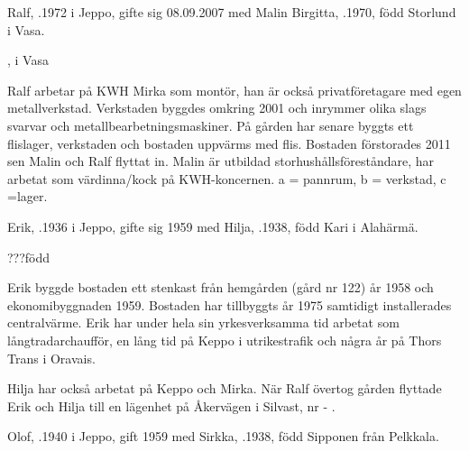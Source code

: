 


Ralf, .1972 i Jeppo, gifte sig 08.09.2007 med Malin Birgitta, .1970, född Storlund i Vasa.
\begin{jhchildren}
  \item {}, i Vasa
  \item {}
  \item {}
\end{jhchildren}

Ralf arbetar på KWH Mirka som montör, han är också privatföretagare med egen metallverkstad. Verkstaden byggdes omkring 2001 och inrymmer olika slags svarvar och metallbearbetningsmaskiner. På gården har senare byggts ett flislager, verkstaden och bostaden uppvärms med flis. Bostaden förstorades 2011 sen Malin och Ralf flyttat in. Malin är utbildad storhushållsföreståndare, har	arbetat som värdinna/kock på KWH-koncernen. a = pannrum, b = verkstad, c =lager.


Erik, .1936 i Jeppo, gifte sig 1959 med Hilja, .1938, född Kari i Alahärmä.
\begin{jhchildren}
  \item {}
  \item {} ???född
\end{jhchildren}
Erik byggde bostaden ett stenkast från hemgården (gård nr 122) år	1958 och ekonomibyggnaden 1959. Bostaden har tillbyggts år 1975 samtidigt installerades centralvärme. Erik har under hela sin yrkesverksamma tid arbetat som långtradarchaufför, en lång tid på Keppo i utrikestrafik och några år på Thors Trans i  Oravais.

Hilja 	har också arbetat på Keppo och Mirka. När Ralf övertog gården flyttade Erik och Hilja till en lägenhet på Åkervägen i Silvast, nr -   .






Olof, .1940 i Jeppo, gift 1959 med Sirkka, .1938, född Sipponen från Pelkkala.
\begin{jhchildren}
  \item {}
  \item {}
  \item {}
\end{jhchildren}

